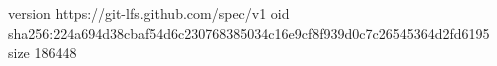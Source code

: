 version https://git-lfs.github.com/spec/v1
oid sha256:224a694d38cbaf54d6c230768385034c16e9cf8f939d0c7c26545364d2fd6195
size 186448
